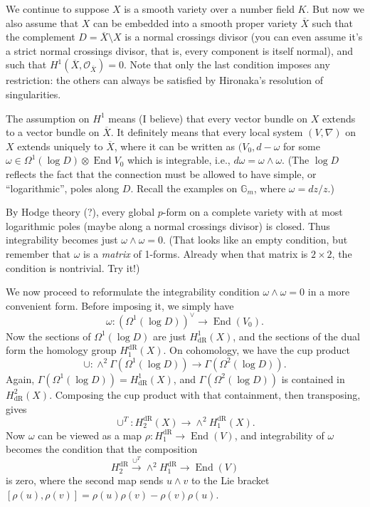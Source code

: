 \documentclass[12pt]{article}
\def\GG{\mathbb{G}}
\def\calO{\mathcal{O}}
\def\dual{\vee}
\DeclareMathOperator{\dR}{dR}
\DeclareMathOperator{\End}{End}
\begin{document}
We continue to suppose $X$ is a smooth variety over a number field $K$. But
now we also assume that $X$ can be embedded into a smooth proper variety
$\overline{X}$ such that the complement $D = \overline{X} \setminus X$
is a normal crossings divisor (you can even assume it's a strict normal
crossings divisor, that is, every component is itself normal),
and such that $H^1(\overline{X}, \calO_{\overline{X}}) = 0$. Note that
only the last condition imposes any restriction: the others can always be
satisfied by Hironaka's resolution of singularities.

The assumption on $H^1$ means (I believe) that every vector bundle
on $X$ extends to a vector bundle on $\overline{X}$. It definitely
means that every local system $(V, \nabla)$ on $X$ extends uniquely
to $\overline{X}$, where it can be written as $(V_0,
d - \omega$ for some $\omega \in \Omega^1(\log D) \otimes \End V_0$
which is integrable, i.e., $d\omega = \omega \wedge \omega$.
(The $\log D$ reflects the fact that
the connection must be allowed to have simple, or ``logarithmic'',
poles along $D$. Recall the examples on $\GG_m$, where $\omega = dz/z$.)

By Hodge theory (?), every global $p$-form on a complete variety with
at most logarithmic poles (maybe along a normal crossings divisor) is
closed. Thus integrability becomes just $\omega \wedge \omega = 0$.
(That looks like an empty condition, but remember that $\omega$ is
a \emph{matrix} of 1-forms. Already when that matrix is $2 \times 2$,
the condition is nontrivial. Try it!)

We now proceed to reformulate the integrability condition $\omega \wedge
\omega = 0$ in a more convenient form. Before imposing it, we simply
have
\[
\omega: (\Omega^1(\log D))^\dual \to \End(V_0).
\]
Now the sections of $\Omega^1(\log D)$ are just $H^1_{\dR}(X)$, and the
sections of the dual form the homology group
$H_1^{\dR}(X)$. On cohomology, we have the cup
product
\[
\cup: \wedge^2 \Gamma(\Omega^1(\log D)) \to \Gamma(\Omega^2(\log D)).
\]
Again, $\Gamma(\Omega^1(\log D)) = H^1_{\dR}(X)$, and
$\Gamma(\Omega^2(\log D))$ is contained in $H^2_{\dR}(X)$.
Composing the cup product with that containment, then transposing, gives
\[
\cup^T: H_2^{\dR}(X) \to \wedge^2 H_1^{\dR}(X).
\]
Now $\omega$ can be viewed as a map $\rho: H_1^{\dR} \to \End(V)$,
and integrability of $\omega$ becomes the condition that the composition
\[
H_2^{\dR} \stackrel{\cup^T}{\to} \wedge^2 H_1^{\dR} \to \End(V) \qquad
\]
is zero, where the second map sends $u \wedge v$ to the Lie bracket
$[\rho(u), \rho(v)] = \rho(u) \rho(v) - \rho(v) \rho(u)$. 
\end{document}
